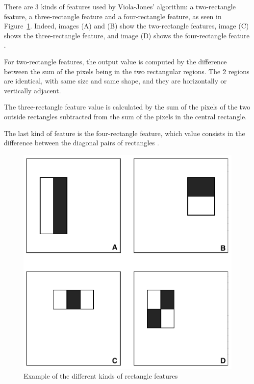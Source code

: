 \noindent There are 3 kinds of features used by Viola-Jones' algorithm: a two-rectangle feature, a three-rectangle feature and a four-rectangle feature, as seen in Figure~\ref{haar_feature_description}. Indeed, images (A) and (B) show the two-rectangle features, image (C) shows the three-rectangle feature, and image (D) shows the four-rectangle feature \cite{VIO01}.
\newline

\noindent For two-rectangle features, the output value is computed by the difference between the sum of the pixels being in the two rectangular regions. The 2 regions are identical, with same size and same shape, and they are horizontally or vertically adjacent. 
\newline

\noindent The three-rectangle feature value is calculated by the sum of the pixels of the two outside rectangles subtracted from the sum of the pixels in the central rectangle. 
\newline

\noindent The last kind of feature is the four-rectangle feature, which value consists in the difference between the diagonal pairs of rectangles \cite{VIO01}.
\newline

\begin{figure}[!h]
\begin{center}
\noindent \includegraphics[scale=0.5]{figures/haar_feature_description} 
\newline
\caption{Example of the different kinds of rectangle features}
\label{haar_feature_description}
\end{center} 
\end{figure}

